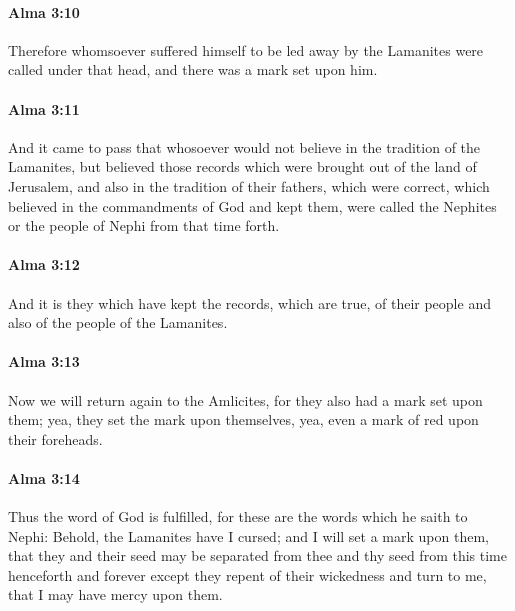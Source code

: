		\paragraph{Alma 3:10} %
			\label{ALMA-3-10}

			Therefore whomsoever suffered himself to be led away by the Lamanites
			were called under that head,
			and there was a mark set upon him.

		\paragraph{Alma 3:11} %
			\label{ALMA-3-11}

			And it came to pass that
			whosoever would not believe in the tradition of the Lamanites,
			but believed those records which were brought out of the land of Jerusalem,
			and also in the tradition of their fathers, which were correct,
			which believed in the commandments of God and kept them,
			were called the Nephites or the people of Nephi
			from that time forth.

		\paragraph{Alma 3:12} %
			\label{ALMA-3-12}

			And it is they which have kept the records, which are true,
			of their people and also of the people of the Lamanites.

		\paragraph{Alma 3:13} %
			\label{ALMA-3-13}

			Now we will return again to the Amlicites,
			for they also had a mark set upon them;
			yea, they set the mark upon themselves,
			yea, even a mark of red upon their foreheads.

		\paragraph{Alma 3:14} %
			\label{ALMA-3-14}

			Thus the word of God is fulfilled,
			for these are the words which he saith to Nephi:
			Behold, the Lamanites have I cursed;
			and I will set a mark upon them,
			that they and their seed may be separated from thee and thy seed
			from this time henceforth and forever
			except they repent of their wickedness and turn to me,
			that I may have mercy upon them.

